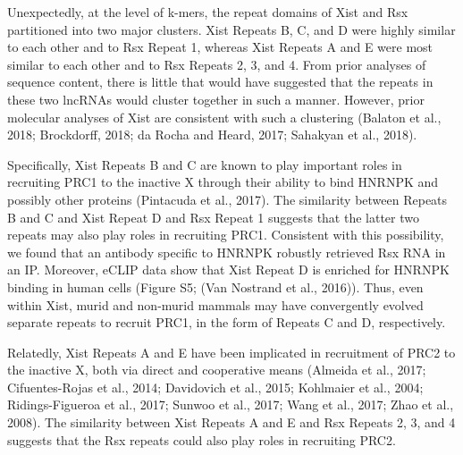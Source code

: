 Unexpectedly, at the level of k-mers, the repeat domains of Xist and Rsx partitioned into two major clusters. Xist Repeats B, C, and D were highly similar to each other and to Rsx Repeat 1, whereas Xist Repeats A and E were most similar to each other and to Rsx Repeats 2, 3, and 4. From prior analyses of sequence content, there is little that would have suggested that the repeats in these two lncRNAs would cluster together in such a manner. However, prior molecular analyses of Xist are consistent with such a clustering (Balaton et al., 2018; Brockdorff, 2018; da Rocha and Heard, 2017; Sahakyan et al., 2018). 

Specifically, Xist Repeats B and C are known to play important roles in recruiting PRC1 to the inactive X through their ability to bind HNRNPK and possibly other proteins (Pintacuda et al., 2017). The similarity between Repeats B and C and Xist Repeat D and Rsx Repeat 1 suggests that the latter two repeats may also play roles in recruiting PRC1. Consistent with this possibility, we found that an antibody specific to HNRNPK robustly retrieved Rsx RNA in an IP. Moreover, eCLIP data show that Xist Repeat D is enriched for HNRNPK binding in human cells (Figure S5; (Van Nostrand et al., 2016)). Thus, even within Xist, murid and non-murid mammals may have convergently evolved separate repeats to recruit PRC1, in the form of Repeats C and D, respectively.

Relatedly, Xist Repeats A and E have been implicated in recruitment of PRC2 to the inactive X, both via direct and cooperative means (Almeida et al., 2017; Cifuentes-Rojas et al., 2014; Davidovich et al., 2015; Kohlmaier et al., 2004; Ridings-Figueroa et al., 2017; Sunwoo et al., 2017; Wang et al., 2017; Zhao et al., 2008). The similarity between Xist Repeats A and E and Rsx Repeats 2, 3, and 4 suggests that the Rsx repeats could also play roles in recruiting PRC2. 

